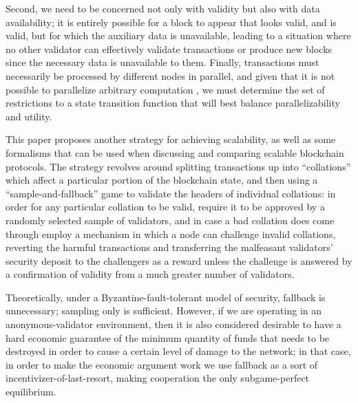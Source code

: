 \documentclass[11pt,a4paper]{article}
\theoremstyle{plain}
\theoremstyle{definition}
\theoremstyle{remark}
\begin{document}
Second, we need to be concerned not only with validity but also with data availability; it is entirely possible for a block to appear that looks valid, and is valid, but for which the auxiliary data is unavailable, leading to a situation where no other validator can effectively validate transactions or produce new blocks since the necessary data is unavailable to them. Finally, transactions must necessarily be processed by different nodes in parallel, and given that it is not possible to parallelize arbitrary computation \cite{parallelcomputing}, we must determine the set of restrictions to a state transition function that will best balance parallelizability and utility.

This paper proposes another strategy for achieving scalability, as well as some formalisms that can be used when discussing and comparing scalable blockchain protocols. The strategy revolves around splitting transactions up into ``collations'' which affect a particular portion of the blockchain state, and then using a ``sample-and-fallback'' game to validate the headers of individual collations: in order for any particular collation to be valid, require it to be approved by a randomly selected sample of validators, and in case a bad collation does come through employ a mechanism in which a node can challenge invalid collations, reverting the harmful transactions and transferring the malfeasant validators' security deposit to the challengers as a reward unless the challenge is answered by a confirmation of validity from a much greater number of validators.

Theoretically, under a Byzantine-fault-tolerant model of security, fallback is unnecessary; sampling only is sufficient. However, if we are operating in an anonymous-validator environment, then it is also considered desirable to have a hard economic guarantee of the minimum quantity of funds that needs to be destroyed in order to cause a certain level of damage to the network; in that case, in order to make the economic argument work we use fallback as a sort of incentivizer-of-last-resort, making cooperation the only subgame-perfect equilibrium.
\end{document}

